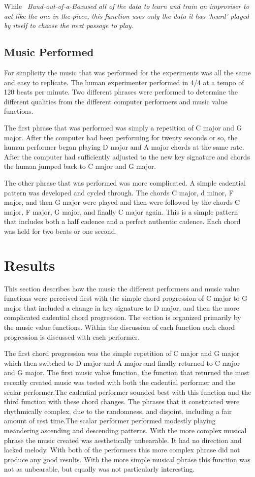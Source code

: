 \documentclass[12pt]{ucthesis}
\begin{document}
{While ~\em{Band-out-of-a-Box}\em used all of the data to learn and train an improviser to act like the one in the piece, this function uses only the data it has 'heard' played by itself to choose the next passage to play. 

\section{Music Performed}
\label{music-performed}
For simplicity the music that was performed for the experiments was all the same and easy to replicate. The human experimenter performed in 4/4 at a tempo of 120 beats per minute. Two different phrases were performed to determine the different qualities from the different computer performers and music value functions. 

The first phrase that was performed was simply a repetition of C major and G major. After the computer had been performing for twenty seconds or so, the human performer began playing D major and A major chords at the same rate. After the computer had sufficiently adjusted to the new key signature and chords the human jumped back to C major and G major. 

The other phrase that was performed was more complicated. A simple cadential pattern was developed and cycled through. The chords C major, d minor, F major, and then G major were played and then were followed by the chords C major, F major, G major, and finally C major again. This is a simple pattern that includes both a half cadence and a perfect authentic cadence. Each chord was held for two beats or one second.

\chapter{Results}
\label{results}
This section describes how the music the different performers and music value functions were perceived first with the simple chord progression of C major to G major that included a change in key signature to D major, and then the more complicated cadential chord progression. The section is organized primarily by the music value functions. Within the discussion of each function each chord progression is discussed with each performer. 

The first chord progression was the simple repetition of C major and G major which then switched to D major and A major and finally returned to C major and G major. The first music value function, the function that returned the most recently created music was tested with both the cadential performer and the scalar performer.The cadential performer sounded best with this function and the third function with these chord changes. The phrases that it constructed were rhythmically complex, due to the randomness, and disjoint, including a fair amount of rest time.The scalar performer performed modestly playing meandering ascending and descending patterns. With the more complex musical phrase the music created was aesthetically unbearable. It had no direction and lacked melody. With both of the performers this more complex phrase did not produce any good results. With the more simple musical phrase this function was not as unbearable, but equally was not particularly interesting.

}
\end{document}
